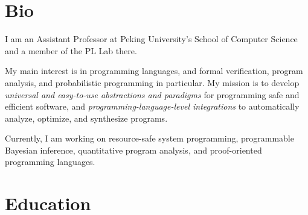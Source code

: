 \documentclass[11pt,letterpaper,roman]{moderncv}        %
\begin{document}
\makecvtitle


\section{Bio}

I am an Assistant Professor at Peking University's School of Computer Science and a member of the PL Lab there.

My main interest is in programming languages, and formal verification, program analysis, and probabilistic programming in particular.
%
My mission is to develop \emph{universal and easy-to-use abstractions and paradigms} for programming safe and efficient software, and \emph{programming-language-level integrations} to automatically analyze, optimize, and synthesize programs.

Currently, I am working on resource-safe system programming, programmable Bayesian inference, quantitative program analysis, and proof-oriented programming languages.

\section{Education}

  {}

  \vspace{4pt}

  {}
\end{document}
